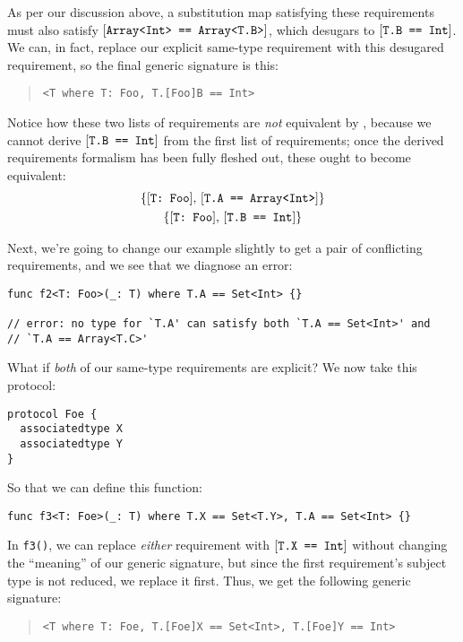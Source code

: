 \documentclass[../generics]{subfiles}
\begin{document}
As per our discussion above, a substitution map satisfying these requirements must also satisfy $[\texttt{Array<Int> == Array<T.B>}]$, which desugars to $[\texttt{T.B == Int}]$. We can, in fact, replace our explicit same-type requirement with this desugared requirement, so the final generic signature is this:
\begin{quote}
\begin{verbatim}
<T where T: Foo, T.[Foo]B == Int>
\end{verbatim}
\end{quote}
Notice how these two lists of requirements are \emph{not} equivalent by , because we cannot derive $[\texttt{T.B == Int}]$ from the first list of requirements; once the derived requirements formalism has been fully fleshed out, these ought to become equivalent:
\begin{gather*}
\{ [\texttt{T:~Foo}],\, [\texttt{T.A == Array<Int>}] \}\\
\{ [\texttt{T:~Foo}],\, [\texttt{T.B == Int}] \}
\end{gather*}

Next, we're going to change our example slightly to get a pair of conflicting requirements, and we see that we diagnose an error:
\begin{Verbatim}
func f2<T: Foo>(_: T) where T.A == Set<Int> {}

// error: no type for `T.A' can satisfy both `T.A == Set<Int>' and
// `T.A == Array<T.C>'
\end{Verbatim}

What if \emph{both} of our same-type requirements are explicit? We now take this protocol:
\begin{Verbatim}
protocol Foe {
  associatedtype X
  associatedtype Y
}
\end{Verbatim}
So that we can define this function:
\begin{Verbatim}
func f3<T: Foe>(_: T) where T.X == Set<T.Y>, T.A == Set<Int> {}
\end{Verbatim}
In \texttt{f3()}, we can replace \emph{either} requirement with $[\texttt{T.X == Int}]$ without changing the ``meaning'' of our generic signature, but since the first requirement's subject type is not reduced, we replace it first. Thus, we get the following generic signature:
\begin{quote}
\begin{verbatim}
<T where T: Foe, T.[Foe]X == Set<Int>, T.[Foe]Y == Int>
\end{verbatim}
\end{quote}
\end{document}
